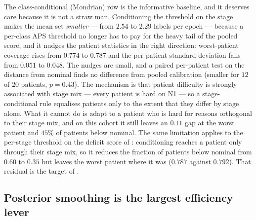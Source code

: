 The class-conditional (Mondrian) row is the informative baseline, and it
deserves care because it is not a straw man. Conditioning the threshold on the
stage makes the mean set \emph{smaller} --- from $2.54$ to $2.29$ labels per
epoch --- because a per-class APS threshold no longer has to pay for the heavy
tail of the pooled score, and it nudges the patient statistics in the right
direction: worst-patient coverage rises from $0.774$ to $0.787$ and the
per-patient standard deviation falls from $0.051$ to $0.048$. The nudges are
small, and a paired per-patient test on the distance from nominal finds no
difference from pooled calibration (smaller for $12$ of $20$ patients,
$p=0.43$). The mechanism is that patient difficulty is strongly associated with
stage mix --- every patient is hard on N1 --- so a stage-conditional rule
equalises patients only to the extent that they differ by stage alone. What it
cannot do is adapt to a patient who is hard for reasons orthogonal to their
stage mix, and on this cohort it still leaves an $0.11$ gap at the worst
patient and $45\%$ of patients below nominal. The same limitation applies to
the per-stage threshold on the deficit score of :
conditioning reaches a patient only through their stage mix, so it reduces
the fraction of patients below nominal from $0.60$ to $0.35$ but leaves the
worst patient where it was ($0.787$ against $0.792$). That residual is the
target of .



\subsection{Posterior smoothing is the largest efficiency lever}
\label{sec:results-score}

